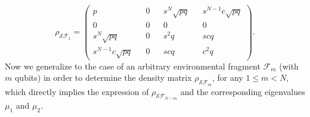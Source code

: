 \documentclass[aps,prl,showpacs,amsmath,amssymb,amsfonts,lengthcheck,onecolumn,longbibliography,superscriptaddress]{revtex4-2}
\newcommand{\+}         {\dagger}
\newcommand\cF{{\mathcal F}}
\newcommand{\mc}[1]{\mathcal{#1}}
\begin{document}
\begin{equation}
	\rho_{\mc{S}\mc{F}_1}=\begin{pmatrix}
		p && 0 && s^{N}\sqrt{pq} && s^{N-1}c\sqrt{pq} \\
		0 && 0 && 0 && 0\\
		s^{N}\sqrt{pq}&& 0 && s^2 q && s c q\\
		s^{N-1}c\sqrt{pq}&& 0 && s c q && c^2 q
	\end{pmatrix}.
\end{equation}
Now we generalize to the case of an arbitrary environmental fragment $\cF_m$ (with $m$ qubits) in order to determine the density matrix $\rho_{\mc{S}\mc{F}_m}$, for any $1\leq m < N$, which directly implies the expression of $\rho_{\mc{S}\mc{F}_{N-m}}$ and the corresponding eigenvalues $\mu_1$ and $\mu_2$.
\end{document}
